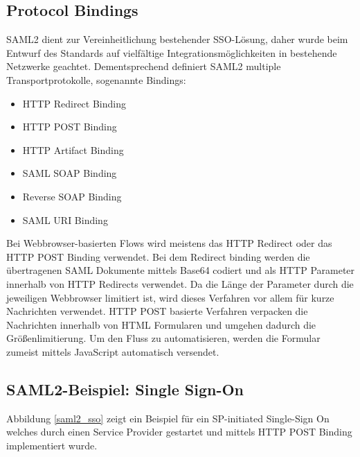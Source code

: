 \subsection{Protocol Bindings}

SAML2 dient zur Vereinheitlichung bestehender SSO-Lösung, daher wurde beim Entwurf des Standards auf vielfältige Integrationsmöglichkeiten in bestehende Netzwerke geachtet. Dementsprechend definiert SAML2 multiple Transportprotokolle, sogenannte Bindings:

\begin{itemize}
	\item HTTP Redirect Binding
	\item HTTP POST Binding
	\item HTTP Artifact Binding
	\item SAML SOAP Binding
	\item Reverse SOAP Binding
	\item SAML URI Binding
\end{itemize}

Bei Webbrowser-basierten Flows wird meistens das HTTP Redirect oder das HTTP POST Binding verwendet. Bei dem Redirect binding werden die übertragenen SAML Dokumente mittels Base64 codiert und als HTTP Parameter innerhalb von HTTP Redirects verwendet. Da die Länge der Parameter durch die jeweiligen Webbrowser limitiert ist, wird dieses Verfahren vor allem für kurze Nachrichten verwendet. HTTP POST basierte Verfahren verpacken die Nachrichten innerhalb von HTML Formularen und umgehen dadurch die Größenlimitierung. Um den Fluss zu automatisieren, werden die Formular zumeist mittels JavaScript automatisch versendet.

\subsection{SAML2-Beispiel: Single Sign-On}

Abbildung \ref{saml2_sso} zeigt ein Beispiel für ein SP-initiated Single-Sign On welches durch einen Service Provider gestartet und mittels HTTP POST Binding implementiert wurde. 

